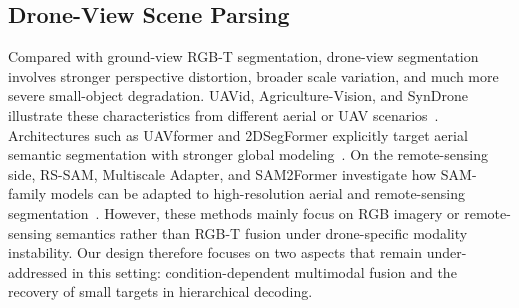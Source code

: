 \subsection{Drone-View Scene Parsing}

Compared with ground-view RGB-T segmentation, drone-view segmentation involves stronger perspective distortion, broader scale variation, and much more severe small-object degradation. UAVid, Agriculture-Vision, and SynDrone illustrate these characteristics from different aerial or UAV scenarios~\cite{lyu2020uavid,chiu2020agriculturevision,rizzoli2023syndrone}. Architectures such as UAVformer and 2DSegFormer explicitly target aerial semantic segmentation with stronger global modeling~\cite{zhang2023uavformer,li2022twodsegformer}. On the remote-sensing side, RS-SAM, Multiscale Adapter, and SAM2Former investigate how SAM-family models can be adapted to high-resolution aerial and remote-sensing segmentation~\cite{zhang2024rssam,chen2025multiscaleadapter,li2025sam2former}. However, these methods mainly focus on RGB imagery or remote-sensing semantics rather than RGB-T fusion under drone-specific modality instability. Our design therefore focuses on two aspects that remain under-addressed in this setting: condition-dependent multimodal fusion and the recovery of small targets in hierarchical decoding.
